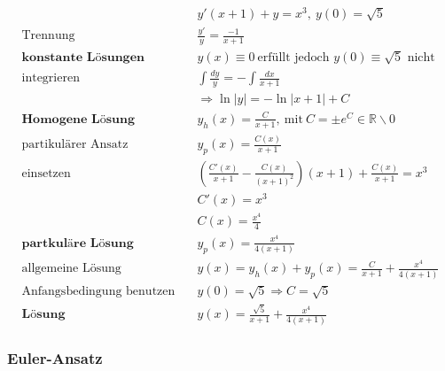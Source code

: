 \documentclass[11pt]{article}
\begin{document}
\begin{equation*}
\begin{split}
	& y'(x+1) + y = x^3,\ y(0) = \sqrt{5} \\
	\text{Trennung}\quad & \frac{y'}{y} = \frac{-1}{x+1} \\
	\textbf{konstante L{\"o}sungen}\quad & y(x) \equiv 0\ \text{erf{\"u}llt jedoch $y(0) \equiv \sqrt{5}$ nicht} \\
	\text{integrieren}\quad & \int \frac{dy}{y} = - \int \frac{dx}{x+1} \\
	& \Rightarrow \ln|y| = -\ln|x+1| + C \\
	\textbf{Homogene L{\"o}sung} \quad & y_h(x) = \frac{C}{x+1},\ \text{mit}\ C= \pm e^C \in \mathbb{R}\backslash{0} \\
	\text{partikul{\"a}rer Ansatz}\quad & y_p(x) = \frac{C(x)}{x+1} \\
	\text{einsetzen} \quad & (\frac{C'(x)}{x+1} - \frac{C(x)}{(x+1)^2})(x+1) + \frac{C(x)}{x+1} = x^3 \\
	& C'(x) = x^3 \\
	& C(x) = \frac{x^4}{4} \\
	\textbf{partkul{\"a}re L{\"o}sung} \quad & y_p(x) = \frac{x^4}{4(x+1)} \\
	\text{allgemeine L{\"o}sung}\quad & y(x) = y_h(x) + y_p(x) = \frac{C}{x+1} + \frac{x^4}{4(x+1)} \\
	\text{Anfangsbedingung benutzen} \quad & y(0) = \sqrt{5} \Rightarrow C = \sqrt{5} \\
	\textbf{L{\"o}sung} \quad & y(x) = \frac{\sqrt{5}}{x+1} + \frac{x^4}{4(x+1)}
\end{split}
\end{equation*}

%

\subsubsection{Euler-Ansatz}
\end{document}
